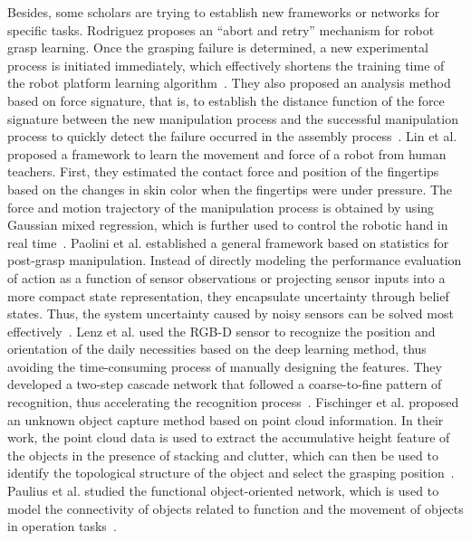 \documentclass[journal,twoside,web]{ieeecolor}
\begin{document}
Besides, some scholars are trying to establish new frameworks or networks for specific tasks. 
Rodriguez proposes an “abort and retry” mechanism for robot grasp learning. Once the grasping failure is determined, a new experimental process is initiated immediately, which effectively shortens the training time of the robot platform learning algorithm~\cite{Rodriguez2011}. 
They also proposed an analysis method based on force signature, that is, to establish the distance function of the force signature between the new manipulation process and the successful manipulation process to quickly detect the failure occurred in the assembly process~\cite{Rodriguez2010}.
Lin et al. proposed a framework to learn the movement and force of a robot from human teachers. First, they estimated the contact force and position of the fingertips based on the changes in skin color when the fingertips were under pressure. The force and motion trajectory of the manipulation process is obtained by using Gaussian mixed regression, which is further used to control the robotic hand in real time~\cite{Lin2012}.
Paolini et al. established a general framework based on statistics for post-grasp manipulation. Instead of directly modeling the performance evaluation of action as a function of sensor observations or projecting sensor inputs into a more compact state representation, they encapsulate uncertainty through belief states. Thus, the system uncertainty caused by noisy sensors can be solved most effectively~\cite{Paolini2014}. 
Lenz et al. used the RGB-D sensor to recognize the position and orientation of the daily necessities based on the deep learning method, thus avoiding the time-consuming process of manually designing the features. They developed a two-step cascade network that followed a coarse-to-fine pattern of recognition, thus accelerating the recognition process~\cite{Lenz2015}.
Fischinger et al. proposed an unknown object capture method based on point cloud information. In their work, the point cloud data is used to extract the accumulative height feature of the objects in the presence of stacking and clutter, which can then be used to identify the topological structure of the object and select the grasping position~\cite{Fischinger2015}. 
Paulius et al. studied the functional object-oriented network, which is used to model the connectivity of objects related to function and the movement of objects in operation tasks~\cite{Paulius2016}. 
\end{document}
